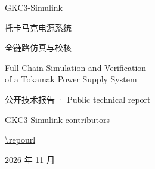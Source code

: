 \documentclass[UTF8,zihao=5,oneside,openany,fontset=fandol]{ctexbook}
\begin{document}
\hypersetup{pageanchor=false}
\begin{titlepage}
\centering
\vspace*{25mm}
{\color{accent}\sffamily\Large GKC3-Simulink\par}
\vspace{18mm}
{\heiti\Huge 托卡马克电源系统\par}
\vspace{5mm}
{\heiti\Huge 全链路仿真与校核\par}
\vspace{12mm}
{\Large Full-Chain Simulation and Verification\\of a Tokamak Power Supply System\par}
\vspace{16mm}
{\large 公开技术报告 · Public technical report\par}
\vfill
{\large GKC3-Simulink contributors\par}
\vspace{5mm}
\url{\repourl}\par
\vspace{8mm}
{\large 2026 年 11 月\par}
\end{titlepage}
\frontmatter
\hypersetup{pageanchor=true}
\pagestyle{plain}

\hypersetup{linkcolor=black}
\tableofcontents
\hypersetup{linkcolor=accent}


\mainmatter
\pagestyle{reportbody}











\FloatBarrier
\printbibliography[heading=bibintoc]

\appendix
\captionsetup{list=no}


\end{document}
